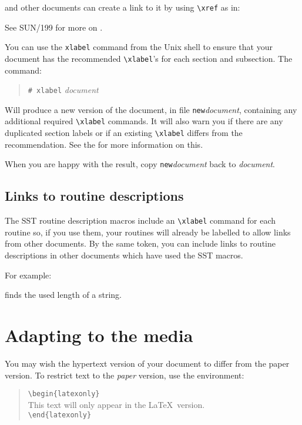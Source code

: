 \documentclass[twoside,11pt,nolof]{starlink}
\begin{document}
and other documents can create a link to it by using \verb+\xref+ as in:

\begin{terminalv}
See SUN/199 for more on
.
\end{terminalv}

You can use the \texttt{xlabel} command from the Unix shell to ensure that your
document has the recommended \verb+\xlabel+'s for each section and subsection.
The command:
\begin{quote}
\texttt{\# xlabel} \textit{document}
\end{quote}
Will produce a new version of the document, in file
\texttt{new}\textit{document},
containing any additional required \verb+\xlabel+ commands.
It will also warn you if there are any duplicated section labels or if an
existing  \verb+\xlabel+ differs from the recommendation.
See the
 for more information on this.

When you are happy with the result, copy \texttt{new}\textit{document} back to
\textit{document}.

\subsection{Links to routine descriptions}

The SST routine description macros include an \verb#\xlabel# command for
each routine so, if you use them, your routines will
already be labelled to allow links from other documents. By the same token,
you can include links to routine descriptions in other documents which have
used the SST macros.

For example:
\begin{terminalv}
 finds the used length of a string.
\end{terminalv}

\section{\label{conditional_text}Adapting to the media}

You may wish the hypertext version of your document to differ from the paper
version.
To restrict text to the \emph{paper}\/ version, use the environment:

\begin{quote}
\verb!\begin!\verb!{latexonly}!\\
This text will only appear in the \LaTeX\ version. \\
\verb!\end!\verb!{latexonly}!
\end{quote}
\end{document}
